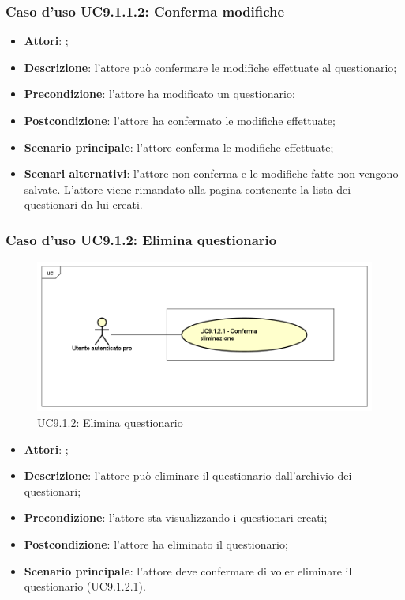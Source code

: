 					\subsubsection{Caso d'uso UC9.1.1.2: Conferma modifiche}
					\label{UC9.1.1.2}
					\begin{itemize}
						\item \textbf{Attori}: \uaupro{};
						\item \textbf{Descrizione}: l'attore può confermare le modifiche effettuate al questionario;
						\item \textbf{Precondizione}: l'attore ha modificato un questionario;
						\item \textbf{Postcondizione}: l'attore ha confermato le modifiche effettuate;
						\item \textbf{Scenario principale}: l'attore conferma le modifiche effettuate;
						\item \textbf{Scenari alternativi}: l'attore non conferma e le modifiche fatte non vengono salvate. L'attore viene rimandato alla pagina contenente la lista dei questionari da lui creati.
					\end{itemize}
										
			\subsubsection{Caso d'uso UC9.1.2: Elimina questionario}
			\label{UC9.1.2}
			\begin{figure}[h]
				\centering
			\includegraphics[scale=0.5,keepaspectratio]{UML/UC9_1_2.png}
				\caption{UC9.1.2: Elimina questionario}
			\end{figure}
			\FloatBarrier
			\begin{itemize}
				\item \textbf{Attori}: \uaupro{};
				\item \textbf{Descrizione}: l'attore può eliminare il questionario dall'archivio dei questionari;
				\item \textbf{Precondizione}: l'attore sta visualizzando i questionari creati;
				\item \textbf{Postcondizione}: l'attore ha eliminato il questionario;
				\item \textbf{Scenario principale}: l'attore deve confermare di voler eliminare il questionario (UC9.1.2.1).
			\end{itemize}
			
